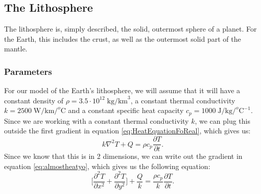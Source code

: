 \documentclass[reprint,english,notitlepage]{revtex4-1}  %
\begin{document}
\subsection{The Lithosphere}

The lithosphere is, simply described, the solid, outermost sphere of a planet. For the Earth, this includes the crust, as well as the outermost solid part of the mantle. 

\subsubsection{Parameters}

For our model of the Earth's lithosphere, we will assume that it will have a constant density of $\rho = 3.5\cdot10^{12}\;\text{kg/km}^3$, a constant thermal conductivity $k = 2500\;\text{W/km/}^o\text{C}$ and a constant specific heat capacity $c_p = 1000\;\text{J/kg/}^o\text{C}^{-1}$. Since we are working with a constant thermal conductivity $k$, we can plug this outside the first gradient in equation \ref{eq:HeatEquationFoReal}, which gives us:
\begin{equation}\label{eq:almostheatyo}
    k\nabla^2T + Q = \rho c_p \frac{\partial T}{\partial t}.
\end{equation}
Since we know that this is in 2 dimensions, we can write out the gradient in equation \ref{eq:almostheatyo}, which gives us the following equation:
\begin{equation}\label{eq:actuallyheatyo}
    \Bigg[\frac{\partial^2 T}{\partial x^2} + \frac{\partial^2 T}{\partial y^2}\Bigg] + \frac{Q}{k} = \frac{\rho c_p}{k} \frac{\partial T}{\partial t}.
\end{equation}
\end{document}
